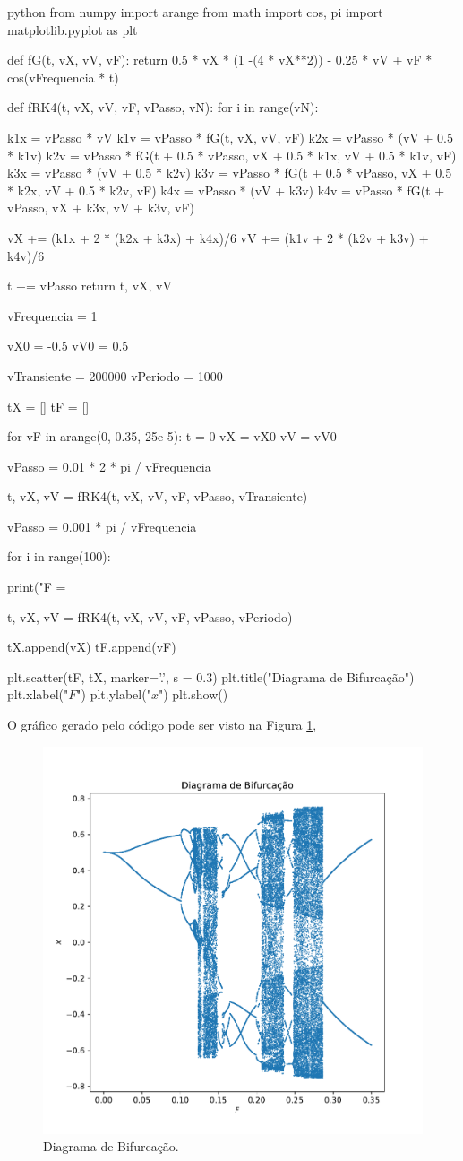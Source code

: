 \documentclass[twoside]{amsart}
\numberwithin{equation}{section}
\begin{document}
\begin{mintedbox}{python}
from numpy import arange
from math import cos, pi
import matplotlib.pyplot as plt

def fG(t, vX, vV, vF):
    return 0.5 * vX * (1 -(4 * vX**2)) - 0.25 * vV + vF * cos(vFrequencia * t)

def fRK4(t, vX, vV, vF, vPasso, vN):
    for i in range(vN):

        k1x = vPasso * vV
        k1v = vPasso * fG(t, vX, vV, vF)
        k2x = vPasso * (vV + 0.5 * k1v)
        k2v = vPasso * fG(t + 0.5 * vPasso, vX + 0.5 * k1x, vV + 0.5 * k1v, vF)
        k3x = vPasso * (vV + 0.5 * k2v)
        k3v = vPasso * fG(t + 0.5 * vPasso, vX + 0.5 * k2x, vV + 0.5 * k2v, vF)
        k4x = vPasso * (vV + k3v)
        k4v = vPasso * fG(t + vPasso, vX + k3x, vV + k3v, vF)

        vX += (k1x + 2 * (k2x + k3x) + k4x)/6
        vV += (k1v + 2 * (k2v + k3v) + k4v)/6

        t += vPasso
    return t, vX, vV

vFrequencia = 1

vX0 = -0.5
vV0 = 0.5

vTransiente = 200000
vPeriodo = 1000

tX = []
tF = []

for vF in arange(0, 0.35, 25e-5):
    t = 0
    vX = vX0
    vV = vV0

    vPasso = 0.01 * 2 * pi / vFrequencia

    t, vX, vV = fRK4(t, vX, vV, vF, vPasso, vTransiente)

    vPasso = 0.001 * pi / vFrequencia

    for i in range(100):

        print("F = %

        t, vX, vV = fRK4(t, vX, vV, vF, vPasso, vPeriodo)

        tX.append(vX)
        tF.append(vF)

plt.scatter(tF, tX, marker='.', s = 0.3)
plt.title("Diagrama de Bifurcação")
plt.xlabel("$F$")
plt.ylabel("$x$")
plt.show()
\end{mintedbox}

O gráfico gerado pelo código pode ser visto na Figura \ref{bif},

\begin{figure}[h]
    \includegraphics[width=0.5\linewidth]{bifurcaco.pdf}
    \caption{Diagrama de Bifurcação.}
    \label{bif}
\end{figure}
\end{document}
